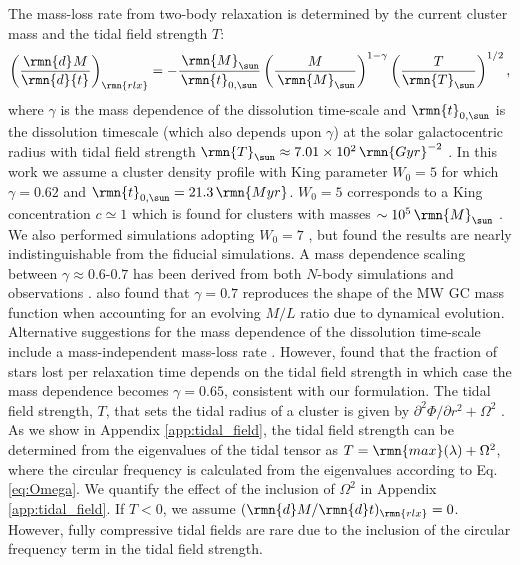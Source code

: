\documentclass[fleqn,usenatbib]{mnras}
\newcommand\Msun{\,\rmn{M}_{\sun}}
\newcommand\Gyr{\,\rmn{Gyr}}
\newcommand\Myr{\,\rmn{Myr}}
\newcommand{\derBr}[3][]{\left( \frac{\rmn{d}^{#1} #2}{\rmn{d} {#3}^{#1}} \right)}
\begin{document}
The mass-loss rate from two-body relaxation is determined by the current cluster mass and the tidal field strength $T$:
\begin{equation} \label{eq:dmrlx}
\derBr{M}{t}_\rmn{rlx} = -\frac{\Msun}{\rmn{t}_{0,\sun}} \left(\frac{M}{\Msun}\right)^{1-\gamma} \left(\frac{T} {\rmn{T}_{\sun}} \right)^{1/2},
\end{equation}
where $\gamma$ is the mass dependence of the dissolution time-scale and $\rmn{t}_{0,\sun}$ is the dissolution timescale (which also depends upon $\gamma$) at the solar galactocentric radius with tidal field strength $\rmn{T}_{\sun} \approx 7.01 \times 10^2 \Gyr^{-2}$ \citep{Kruijssen_et_al_11}.
In this work we assume a cluster density profile with King parameter $W_0 = 5$ for which $\gamma=0.62$ \citep{Lamers_et_al_05a} and $\rmn{t}_{0,\sun} = 21.3 \Myr$. $W_0=5$ corresponds to a King concentration $c \simeq 1$ which is found for clusters with masses $\sim 10^5 \Msun$ \citep{King_66, McLaughlin_00}. We also performed simulations adopting $W_0 = 7$ \citep[represented as $\gamma=0.7$ with $\rmn{t}_{0,\sun} = 10.7 \Myr$,][]{Kruijssen_and_Mieske_09}, but found the results are nearly indistinguishable from the fiducial simulations. A mass dependence scaling between $\gamma \approx 0.6$-$0.7$ has been derived from both $N$-body simulations \citep{Baumgardt_and_Makino_03, Gieles_and_Baumgardt_08} and observations \citep{Boutloukos_and_Lamers_03, Lamers_et_al_05a}. \citet{Kruijssen_and_PortegiesZwart_09} also found that $\gamma=0.7$ reproduces the shape of the MW GC mass function when accounting for an evolving $M/L$ ratio due to dynamical evolution. Alternative suggestions for the mass dependence of the dissolution time-scale include a mass-independent mass-loss rate \citep[i.e. $\gamma=1$,][]{Fall_and_Zhang_01, McLaughlin_and_Fall_08}. However, \citet{Gieles_and_Baumgardt_08} found that the fraction of stars lost per relaxation time \citep[assumed to be constant by][]{Fall_and_Zhang_01} depends on the tidal field strength in which case the mass dependence becomes $\gamma=0.65$, consistent with our formulation.
The tidal field strength, $T$, that sets the tidal radius of a cluster is given by $\partial^2 \Phi/\partial r^2 + \Omega^2$ \citep{King_62, Renaud_Gieles_and_Boily_11}. As we show in Appendix \ref{app:tidal_field}, the tidal field strength can be determined from the eigenvalues of the tidal tensor as $T = \rmn{max}(\lambda) + \Omega^2$, where the circular frequency is calculated from the eigenvalues according to Eq. \ref{eq:Omega}. 
We quantify the effect of the inclusion of $\Omega^2$ in Appendix \ref{app:tidal_field}.
If $T < 0$, we assume $(\rmn{d}M / \rmn{d}t)_\rmn{rlx} = 0$. However, fully compressive tidal fields are rare due to the inclusion of the circular frequency term in the tidal field strength.
\end{document}
